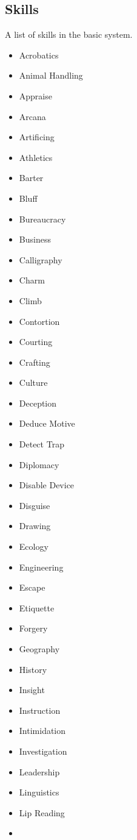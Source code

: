 \documentclass[12pt,]{article}
\providecommand{\tightlist}{%
  \setlength{\itemsep}{0pt}\setlength{\parskip}{0pt}}
\begin{document}
\subsection{Skills}\label{skills}

A list of skills in the basic system.

\begin{itemize}
\tightlist
\item
  Acrobatics
\item
  Animal Handling
\item
  Appraise
\item
  Arcana
\item
  Artificing
\item
  Athletics
\item
  Barter
\item
  Bluff
\item
  Bureaucracy
\item
  Business
\item
  Calligraphy
\item
  Charm
\item
  Climb
\item
  Contortion
\item
  Courting
\item
  Crafting
\item
  Culture
\item
  Deception
\item
  Deduce Motive
\item
  Detect Trap
\item
  Diplomacy
\item
  Disable Device
\item
  Disguise
\item
  Drawing
\item
  Ecology
\item
  Engineering
\item
  Escape
\item
  Etiquette
\item
  Forgery
\item
  Geography
\item
  History
\item
  Insight
\item
  Instruction
\item
  Intimidation
\item
  Investigation
\item
  Leadership
\item
  Linguistics
\item
  Lip Reading
\item

\end{itemize}
\end{document}
